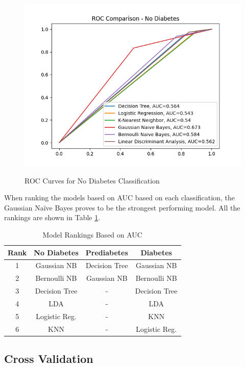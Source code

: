 \documentclass[journal]{IEEEtran}
\begin{document}
\begin{figure}[h!]
    \centering
    \includegraphics[scale=0.5]{ROC Comparison - No Diabetes.png}
    \label{fig:nodiabetes}
    \caption{ROC Curves for No Diabetes Classification}
\end{figure}

\pagebreak

When ranking the models based on AUC based on each classification, the Gaussian Naïve Bayes proves to be the strongest performing model. All the rankings are shown in Table \ref{table:auc-rankings}.

\begin{table}[h!]
\centering
\begin{tabular}{c | c c c}
Rank & No Diabetes & Prediabetes & Diabetes \\
\hline
1 & Gaussian NB & Decision Tree & Gaussian NB \\
2 & Bernoulli NB & Gaussian NB & Bernoulli NB\\
3 & Decision Tree & - & Decision Tree\\
4 & LDA & - & LDA\\
5 & Logistic Reg. & - & KNN\\
6 & KNN & - & Logistic Reg.\\
\end{tabular}
\caption{Model Rankings Based on AUC}
\label{table:auc-rankings}
\end{table}

\subsection{Cross Validation}
\end{document}
